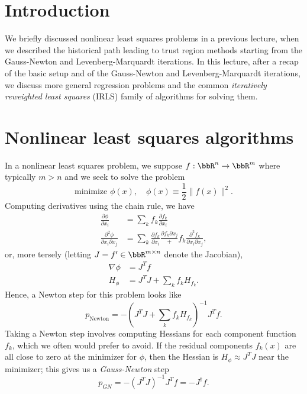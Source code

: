\documentclass[12pt, leqno]{article} %
\begin{document}

\section{Introduction}

We briefly discussed nonlinear least squares problems in a previous
lecture, when we described the historical path leading to trust region
methods starting from the Gauss-Newton and Levenberg-Marquardt iterations.
In this lecture, after a recap of the basic setup and of the
Gauss-Newton and Levenberg-Marquardt iterations, we discuss more
general regression problems and the
common {\em iteratively reweighted least squares} (IRLS) family
of algorithms for solving them.

\section{Nonlinear least squares algorithms}

In a nonlinear least squares problem, we
suppose $f : \bbR^n \rightarrow \bbR^m$ where
typically $m > n$ and we seek to solve the problem
\[
  \mbox{minimize } \phi(x), \quad \phi(x) \equiv \frac{1}{2} \|f(x)\|^2.
\]
Computing derivatives using the chain rule, we have
\begin{align*}
  \frac{\partial \phi}{\partial x_i} &=
  \sum_k f_k \frac{\partial f_k}{\partial x_i} \\
  \frac{\partial^2 \phi}{\partial x_i \partial x_j} &=
  \sum_k
    \frac{\partial f_k}{\partial x_i} \frac{\partial f_k \partial x_j} +
    f_k \frac{\partial^2 f_k}{\partial x_i \partial x_j},
\end{align*}
or, more tersely (letting $J = f' \in \bbR^{m \times n}$ denote the Jacobian),
\begin{align*}
  \nabla \phi &= J^T f \\
  H_{\phi} &= J^T J + \sum_{k} f_k H_{f_k}.
\end{align*}
Hence, a Newton step for this problem looks like
\[
  p_{\mbox{Newton}} = -\left( J^T J + \sum_k f_k H_{f_k} \right)^{-1} J^T f.
\]
Taking a Newton step involves computing Hessians for each component
function $f_k$, which we often would prefer to avoid.  If the residual
components $f_k(x)$ are all close to zero at the minimizer for $\phi$, then the
Hessian is $H_{\phi} \approx J^T J$ near the minimizer; this gives us
a {\em Gauss-Newton} step
\[
  p_{GN} = -(J^T J)^{-1} J^T f = -J^\dagger f.
\]
\end{document}

